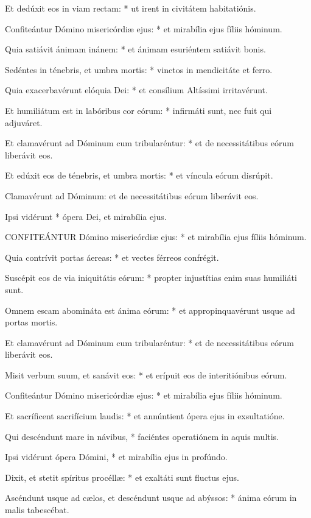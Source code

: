 Et dedúxit eos in viam rectam: * ut irent in civitátem habitatiónis.

Confiteántur Dómino misericórdiæ ejus: * et mirabília ejus fíliis hóminum.

Quia satiávit ánimam inánem: * et ánimam esuriéntem satiávit bonis.

Sedéntes in ténebris, et umbra mortis: * vinctos in mendicitáte et ferro.

Quia exacerbavérunt elóquia Dei: * et consílium Altíssimi irritavérunt.

Et humiliátum est in labóribus cor eórum: * infirmáti sunt, nec fuit qui adjuváret.

Et clamavérunt ad Dóminum cum tribularéntur: * et de necessitátibus eórum liberávit eos.

Et edúxit eos de ténebris, et umbra mortis: * et víncula eórum disrúpit.

 Clamavérunt ad Dóminum: et de necessitátibus eórum liberávit eos.

 Ipsi vidérunt * ópera Dei, et mirabília ejus.


\lettrine[lines=2]{C}{ONFITEÁNTUR} Dómino misericórdiæ ejus: * et mirabília ejus fíliis hóminum.

Quia contrívit portas áereas: * et vectes férreos confrégit.

Suscépit eos de via iniquitátis eórum: * propter injustítias enim suas humiliáti sunt.

Omnem escam abomináta est ánima eórum: * et appropinquavérunt usque ad portas mortis.

Et clamavérunt ad Dóminum cum tribularéntur: * et de necessitátibus eórum liberávit eos.

Misit verbum suum, et sanávit eos: * et erípuit eos de interitiónibus eórum.

Confiteántur Dómino misericórdiæ ejus: * et mirabília ejus fíliis hóminum.

Et sacríficent sacrifícium laudis: * et annúntient ópera ejus in exsultatióne.

Qui descéndunt mare in návibus, * faciéntes operatiónem in aquis multis.

Ipsi vidérunt ópera Dómini, * et mirabília ejus in profúndo.

Dixit, et stetit spíritus procéllæ: * et exaltáti sunt fluctus ejus.

Ascéndunt usque ad cælos, et descéndunt usque ad abýssos: * ánima eórum in malis tabescébat.

